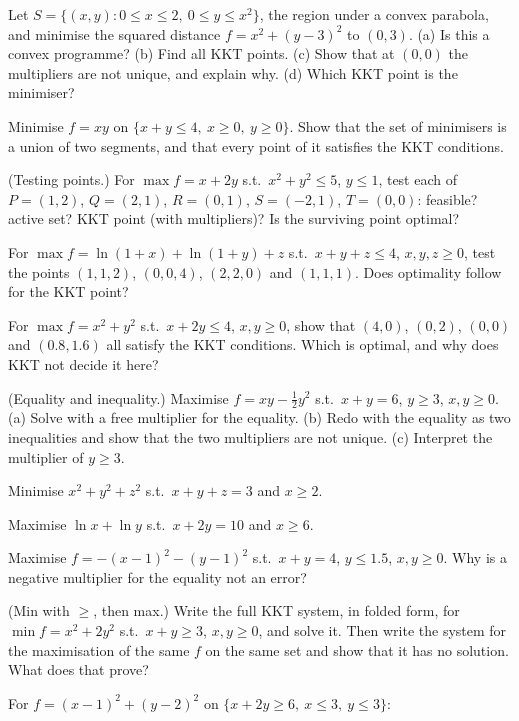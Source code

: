 \begin{problems}
  \item Let $S=\{(x,y): 0\le x\le2,\ 0\le y\le x^{2}\}$, the region under a
        convex parabola, and minimise the squared distance
        $f=x^{2}+(y-3)^{2}$ to $(0,3)$. (a) Is this a convex programme?
        (b) Find all KKT points. (c) Show that at $(0,0)$ the multipliers
        are not unique, and explain why. (d) Which KKT point is the
        minimiser?
  \item Minimise $f=xy$ on $\{x+y\le4,\ x\ge0,\ y\ge0\}$. Show that the set
        of minimisers is a union of two segments, and that every point of it
        satisfies the KKT conditions.
  \item (Testing points.) For $\max f=x+2y$ s.t.\ $x^{2}+y^{2}\le5$,
        $y\le1$, test each of $P=(1,2)$, $Q=(2,1)$, $R=(0,1)$, $S=(-2,1)$,
        $T=(0,0)$: feasible? active set? KKT point (with multipliers)? Is the
        surviving point optimal?
  \item For $\max f=\ln(1+x)+\ln(1+y)+z$ s.t.\ $x+y+z\le4$,
        $x,y,z\ge0$, test the points $(1,1,2)$, $(0,0,4)$, $(2,2,0)$ and
        $(1,1,1)$. Does optimality follow for the KKT point?
  \item For $\max f=x^{2}+y^{2}$ s.t.\ $x+2y\le4$, $x,y\ge0$, show that
        $(4,0)$, $(0,2)$, $(0,0)$ and $(0.8,1.6)$ all satisfy the KKT
        conditions. Which is optimal, and why does KKT not decide it here?
  \item (Equality and inequality.) Maximise $f=xy-\tfrac12y^{2}$ s.t.\
        $x+y=6$, $y\ge3$, $x,y\ge0$. (a) Solve with a free multiplier for
        the equality. (b) Redo with the equality as two inequalities and
        show that the two multipliers are not unique. (c) Interpret the
        multiplier of $y\ge3$.
  \item Minimise $x^{2}+y^{2}+z^{2}$ s.t.\ $x+y+z=3$ and $x\ge2$.
  \item Maximise $\ln x+\ln y$ s.t.\ $x+2y=10$ and $x\ge6$.
  \item Maximise $f=-(x-1)^{2}-(y-1)^{2}$ s.t.\ $x+y=4$, $y\le1.5$,
        $x,y\ge0$. Why is a negative multiplier for the equality not an
        error?
  \item (Min with $\ge$, then max.) Write the full KKT system, in folded
        form, for $\min f=x^{2}+2y^{2}$ s.t.\ $x+y\ge3$, $x,y\ge0$, and solve
        it. Then write the system for the maximisation of the same $f$ on
        the same set and show that it has no solution. What does that prove?
  \item For $f=(x-1)^{2}+(y-2)^{2}$ on $\{x+2y\ge6,\ x\le3,\ y\le3\}$:

\end{problems}

